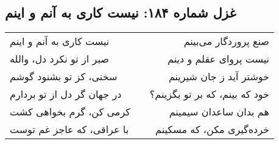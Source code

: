 \begin{center}
\section*{غزل شماره ۱۸۴: نیست کاری به آنم و اینم}
\label{sec:184}
\begin{longtable}{l p{0.5cm} r}
نیست کاری به آنم و اینم
&&
صنع پروردگار می‌بینم
\\
صبر از تو نکرد دل، والله
&&
نیست پروای عقلم و دینم
\\
سخنی، کز تو بشنود گوشم
&&
خوشتر آید ز جان شیرینم
\\
در جهان گر دل از تو بردارم
&&
خود که بینم، که بر تو بگزینم؟
\\
کرمی کن، گرم بخواهی کشت
&&
هم بدان ساعدان سیمینم
\\
با عراقی، که عاجز غم توست
&&
خرده‌گیری مکن، که مسکینم
\\
\end{longtable}
\end{center}
